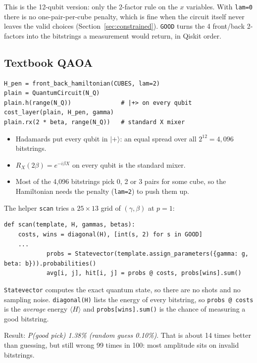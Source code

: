 \documentclass[11pt]{article}
\newcommand{\code}[1]{\texttt{#1}}
\begin{document}
This is the 12-qubit version: only the 2-factor rule on the $x$ variables. With
\code{lam=0} there is no one-pair-per-cube penalty, which is fine when the
circuit itself never leaves the valid choices (Section~\ref{sec:constrained}).
\code{GOOD} turns the 4 front/back 2-factors into the bitstrings a measurement
would return, in Qiskit order.

\subsection{Textbook QAOA}

\begin{lstlisting}
H_pen = front_back_hamiltonian(CUBES, lam=2)
plain = QuantumCircuit(N_Q)
plain.h(range(N_Q))              # |+> on every qubit
cost_layer(plain, H_pen, gamma)
plain.rx(2 * beta, range(N_Q))   # standard X mixer
\end{lstlisting}

\begin{itemize}
  \item Hadamards put every qubit in $|+\rangle$: an equal spread over all
        $2^{12} = 4{,}096$ bitstrings.
  \item $R_X(2\beta) = e^{-i\beta X}$ on every qubit is the standard mixer.
  \item Most of the 4,096 bitstrings pick 0, 2 or 3 pairs for some cube, so the
        Hamiltonian needs the penalty (\code{lam=2}) to push them up.
\end{itemize}

The helper \code{scan} tries a $25 \times 13$ grid of $(\gamma, \beta)$ at
$p=1$:

\begin{lstlisting}
def scan(template, H, gammas, betas):
    costs, wins = diagonal(H), [int(s, 2) for s in GOOD]
    ...
            probs = Statevector(template.assign_parameters({gamma: g, beta: b})).probabilities()
            avg[i, j], hit[i, j] = probs @ costs, probs[wins].sum()
\end{lstlisting}

\code{Statevector} computes the exact quantum state, so there are no shots and
no sampling noise. \code{diagonal(H)} lists the energy of every bitstring, so
\code{probs @ costs} is the \emph{average} energy $\langle H\rangle$ and
\code{probs[wins].sum()} is the chance of measuring a good bitstring.

Result: \emph{P(good pick) 1.38\% (random guess 0.10\%)}. That is about 14
times better than guessing, but still wrong 99 times in 100: most amplitude
sits on invalid bitstrings.
\end{document}
